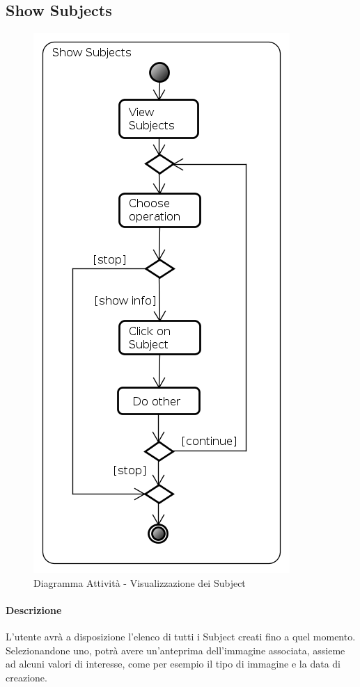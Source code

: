 \subsection{Show Subjects}
\label{showSub}
\begin{figure}[!h]
\centering
\includegraphics[width=0.5\linewidth]{./Content/Immagini/Show_Subjects}
\caption{Diagramma Attività - Visualizzazione dei Subject}
\label{showS}
\end{figure}
\paragraph{Descrizione\\}
L'utente avrà a disposizione l'elenco di tutti i Subject\glossario{} creati fino a quel momento. Selezionandone uno, potrà avere un'anteprima dell'immagine associata, assieme ad alcuni valori di interesse, come per esempio il tipo di immagine e la data di creazione.
\pagebreak

